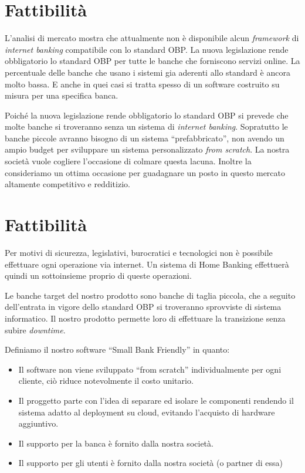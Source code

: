 \documentclass[10pt]{softeng} %
\begin{document}

\section{Fattibilit\`a}

L'analisi di mercato mostra che attualmente non \`e disponibile alcun \emph{framework} di \emph{internet banking} compatibile con lo standard OBP.
La nuova legislazione rende obbligatorio lo standard OBP per tutte le banche che forniscono servizi online.
La percentuale delle banche che usano i sistemi gia aderenti allo standard \`e ancora molto bassa.
E anche in quei casi si tratta spesso di un software costruito su misura per una specifica banca.

Poich\'e la nuova legislazione rende obbligatorio lo standard OBP si prevede che molte banche si troveranno senza un sistema di \emph{internet banking}.
Sopratutto le banche piccole avranno bisogno di un sistema ``prefabbricato'', non avendo un ampio budget per sviluppare un sistema personalizzato \emph{from scratch}.
La nostra societ\`a vuole cogliere l'occasione di colmare questa lacuna.
Inoltre la consideriamo un ottima occasione per guadagnare un posto in questo mercato altamente competitivo e redditizio.

\section{Fattibilit\`a}

Per motivi di sicurezza, legislativi, burocratici e tecnologici non \`e possibile effettuare ogni operazione via internet.
Un sistema di Home Banking effettuer\`a quindi un sottoinsieme proprio di queste operazioni.

Le banche target del nostro prodotto sono banche di taglia piccola, che a seguito dell'entrata in vigore dello standard OBP si troveranno sprovviste di sistema informatico.
Il nostro prodotto permette loro di effettuare la transizione senza subire \emph{downtime}.

Definiamo il nostro software ``Small Bank Friendly'' in quanto:
\begin{itemize}
    \item Il software non viene sviluppato ``from scratch'' individualmente per ogni cliente, ci\`o riduce notevolmente il costo unitario.
    \item Il proggetto parte con l'idea di separare ed isolare le componenti rendendo il sistema adatto al deployment su cloud, evitando l'acquisto di hardware aggiuntivo.
    \item Il supporto per la banca \`e fornito dalla nostra societ\`a.
    \item Il supporto per gli utenti \`e fornito dalla nostra societ\`a (o partner di essa)
\end {itemize}
\end{document}
